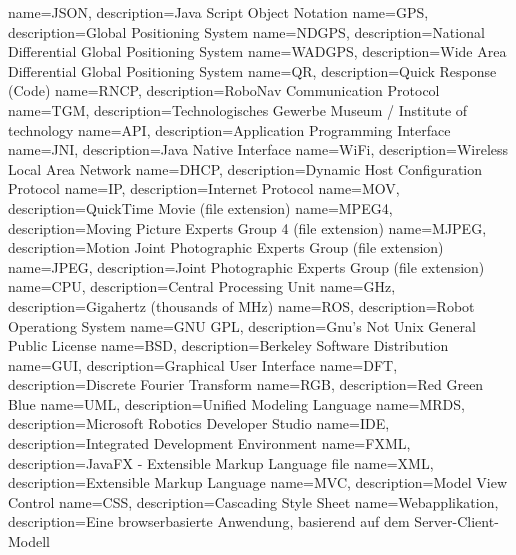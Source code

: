 \makeglossaries
{} {name=JSON, description={Java Script Object Notation}}
 {name=GPS, description={Global Positioning System }}
 {name=NDGPS, description={National Differential Global Positioning System }}
 {name=WADGPS, description={Wide Area Differential Global Positioning System }}
 {name=QR, description={Quick Response (Code) }}
 {name=RNCP, description={RoboNav Communication Protocol}}
 {name=TGM, description={Technologisches Gewerbe Museum / Institute of technology}}
 {name=API, description={Application Programming Interface}}
 {name=JNI, description={Java Native Interface}}
 {name=WiFi, description={Wireless Local Area Network}}
 {name=DHCP, description={Dynamic Host Configuration Protocol}}
 {name=IP, description={Internet Protocol}}
 {name=MOV, description={QuickTime Movie (file extension)}}
 {name=MPEG4, description={Moving Picture Experts Group 4 (file extension)}}
 {name=MJPEG, description={Motion Joint Photographic Experts Group (file extension)}}
 {name=JPEG, description={Joint Photographic Experts Group (file extension)}}
 {name=CPU, description={Central Processing Unit}}
 {name=GHz, description={Gigahertz (thousands of MHz)}}
 {name=ROS, description={Robot Operationg System}}
 {name=GNU GPL, description={Gnu's Not Unix General Public License}}
 {name=BSD, description={Berkeley Software Distribution}}
 {name=GUI, description={Graphical User Interface}}
 {name=DFT, description={Discrete Fourier Transform}}
 {name=RGB, description={Red Green Blue}}
 {name=UML, description={Unified Modeling Language}}
 {name=MRDS, description={Microsoft Robotics Developer Studio}}
 {name=IDE, description={Integrated Development Environment}}
 {name=FXML, description={JavaFX - Extensible Markup Language file}}
 {name=XML, description={Extensible Markup Language}}
 {name=MVC, description={Model View Control}}
 {name=CSS, description={Cascading Style Sheet}}
 {name=Webapplikation, description={Eine browserbasierte Anwendung, basierend auf dem Server-Client-Modell}}
